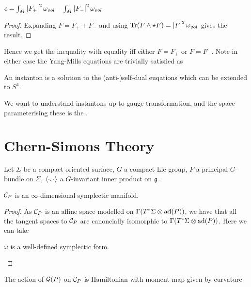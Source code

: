 \documentclass{article}
\begin{document}
\begin{lemma}
	$c = \int_M \left\lvert F_+ \right\rvert^2 \omega_{vol} - \int_M \left\lvert F_- \right\rvert^2 \omega_{vol}$
\end{lemma}
\begin{proof}
Expanding $F = F_+ + F_-$ and using $\operatorname{Tr}(F \wedge \star F) = \left\lvert F \right\rvert^2 \omega_{vol}$ gives the result. 
\end{proof}
	
Hence we get the inequality 
with equality iff either $F= F_+$ or $F=F_-$. Note in either case the Yang-Mills equations are trivially satisfied as 

\begin{definition}
	An instanton is a solution to the (anti-)self-dual euqations which can be extended to $S^4$. 
\end{definition}

We want to understand instantons up to gauge transformation, and the space parameterising these is the . 

\section{Chern-Simons Theory}
Let $\Sigma$ be a compact oriented surface, $G$ a compact Lie group, $P$ a principal $G$-bundle on $\Sigma$, $\left\langle \cdot,\cdot \right\rangle$ a $G$-invariant inner product on $\mathfrak{g}$.

\begin{prop}
	$\mathcal{C}_P$ is an $\infty$-dimensional symplectic manifold. 
\end{prop}
\begin{proof}
	As $\mathcal{C}_P$ is an affine space modelled on $\Gamma(T^\ast \Sigma \otimes \operatorname{ad}(P))$, we have that all the tangent spaces to $\mathcal{C}_P$ are canoncially isomorphic to $\Gamma(T^\ast \Sigma \otimes \operatorname{ad}(P))$. Here we can take 
\begin{claim}
	$\omega$ is a well-defined symplectic form. 
\end{claim}
\end{proof}

\begin{theorem}
	The action of $\mathcal{G}(P)$ on $\mathcal{C}_P$ is Hamiltonian with moment map given by curvature 
\end{theorem}
\end{document}
